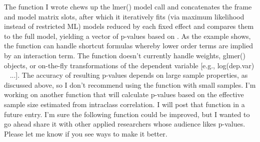 The function I wrote chews up the lmer() model call and concatenates the frame and model matrix slots, after which it iteratively fits (via maximum likelihood instead of restricted ML) models reduced by each fixed effect and compares them to the full model, yielding a vector of p-values based on . As the example shows, the function can handle shortcut formulas whereby lower order terms are implied by an interaction term. The function doesn't currently handle weights, glmer() objects, or on-the-fly transformations of the dependent variable [e.g., log(dep.var) ~ ...]. The accuracy of resulting p-values depends on large sample properties, as discussed above, so I don't recommend using the function with small samples. I'm working on another function that will calculate p-values based on the effective sample size estimated from intraclass correlation. I will post that function in a future entry. I'm sure the following function could be improved, but I wanted to go ahead share it with other applied researchers whose audience likes p-values. Please let me know if you see ways to make it better.

